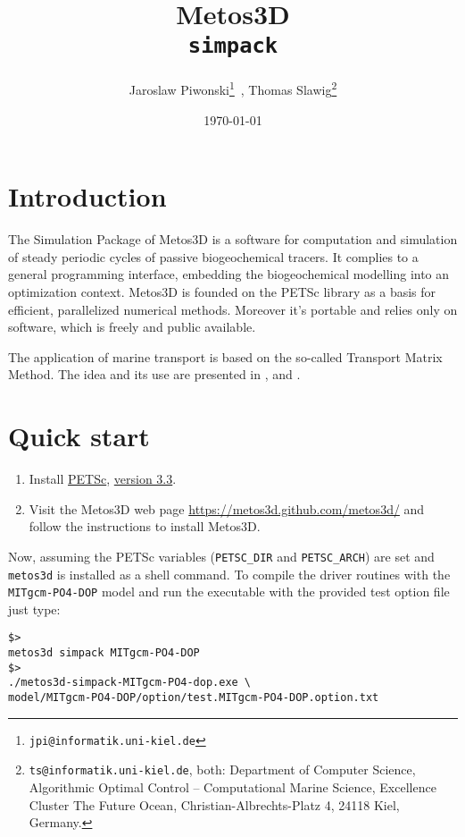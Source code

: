 \documentclass{article}
\begin{document}
%
%
\title{
Metos3D\\
\medskip
\texttt{simpack}
}
\author{
Jaroslaw Piwonski\thanks{\texttt{jpi@informatik.uni-kiel.de}} \,,
Thomas Slawig\thanks{\texttt{ts@informatik.uni-kiel.de},
both: Department of Computer Science, Algorithmic Optimal Control -- Computational Marine Science,
Excellence Cluster The Future Ocean, Christian-Albrechts-Platz 4, 24118 Kiel, Germany.}
}
\date{\today}
\maketitle

%
%
\newpage
\section{Introduction}

The Simulation Package of Metos3D is a software for computation and simulation of
steady periodic cycles of passive biogeochemical tracers. It complies to a general
programming interface, embedding the biogeochemical modelling into an
optimization context.
Metos3D is founded on the PETSc library \cite{PETSc} as a basis for efficient,
parallelized numerical methods. Moreover it's portable and relies only on software,
which is freely and public available.

The application of marine transport is based on the so-called Transport Matrix Method.
The idea and its use are presented in \cite{KhViCa05}, \cite{Kha07} and \cite{Kha08}.

%
%
\section{Quick start}

\begin{enumerate}
%
\item
Install \href{http://www.mcs.anl.gov/petsc/}{PETSc}, 
\href{http://ftp.mcs.anl.gov/pub/petsc/release-snapshots/petsc-3.3-p7.tar.gz}{version 3.3}.
%
\item
Visit the Metos3D web page \href{https://metos3d.github.com/metos3d/}{https://metos3d.github.com/metos3d/}
and follow the instructions to install Metos3D.
\end{enumerate}

Now, assuming the PETSc variables (\texttt{PETSC\_DIR} and \texttt{PETSC\_ARCH}) are set and
\texttt{metos3d} is installed as a shell command. 
%
To compile the driver routines with the \texttt{MITgcm-PO4-DOP} model and
run the executable with the provided test option file just type:
%
\begin{verbatim}
$>
metos3d simpack MITgcm-PO4-DOP
$>
./metos3d-simpack-MITgcm-PO4-dop.exe \
model/MITgcm-PO4-DOP/option/test.MITgcm-PO4-DOP.option.txt
\end{verbatim}
\end{document}
